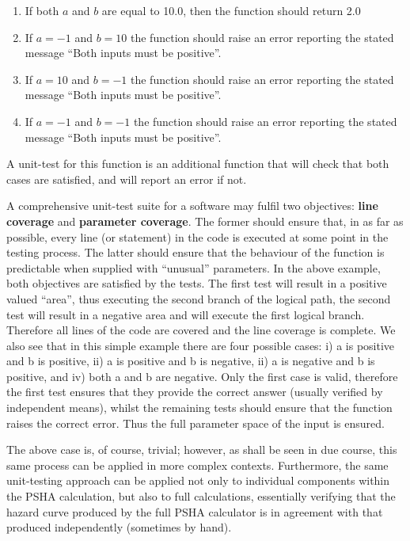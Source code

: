 \begin{enumerate}
\item If both $a$ and $b$ are equal to 10.0, then the function 
    should return 2.0
\item If $a = -1$ and $b = 10$ the function should raise an error 
    reporting the stated message ``Both inputs must be positive''.
\item If $a = 10$ and $b = -1$ the function should raise an error 
    reporting the stated message ``Both inputs must be positive''.
\item If $a = -1$ and $b = -1$ the function should raise an error 
    reporting the stated message ``Both inputs must be positive''.
\end{enumerate}

A unit-test for this function is an additional function that will 
check that both cases are satisfied, and will report an error if not. 

A comprehensive unit-test suite for a software may fulfil two objectives: 
\textbf{line coverage} and \textbf{parameter coverage}. The former should 
ensure that, in as far as possible, every line (or statement) in the code 
is executed at some point in the testing process. The latter should ensure
that the behaviour of the function is predictable when supplied with 
``unusual'' parameters. In the above example, both objectives are satisfied
by the tests. The first test will result in a positive valued ``area'',
thus executing the second branch of the logical path, the second test will
result in a negative area and will execute the first logical branch. 
%
Therefore all lines of the code are covered and the line coverage is 
complete. We also see that in this simple example there are four possible
cases: i) a is positive and b is positive, ii) a is positive and b is 
negative,  ii) a is negative and b is positive, and iv) both a and b 
are negative. Only the first case is valid, therefore the first test 
ensures that they provide the correct answer (usually verified by 
independent means), whilst the remaining tests should ensure that 
the function raises the correct error. Thus the full parameter space 
of the input is ensured.

The above case is, of course, trivial; however, as shall be seen in due
course, this same process can be applied in more complex contexts.
%
Furthermore, the same unit-testing approach can be applied not only 
to individual components within the PSHA calculation, but also to 
full calculations, essentially verifying that the hazard curve 
produced by the full PSHA calculator is in agreement with that 
produced independently (sometimes by hand).
%

